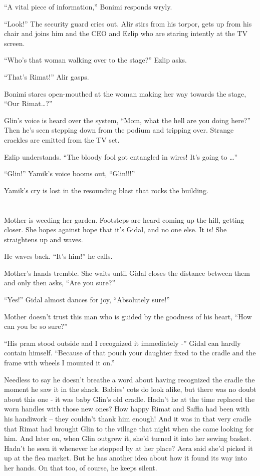 \documentclass[twoside,11pt]{book}
\begin{document}
``A vital piece of information,'' Bonimi responds wryly.

``Look!'' The security guard cries out. Alir stirs from his torpor, gets up from his chair and
joins him and the CEO and Ezlip who are staring intently at the TV screen.

``Who's that woman walking over to the stage?'' Ezlip asks.

``That's Rimat!'' Alir gasps.

Bonimi stares open-mouthed at the woman making her way towards the stage, ``Our
Rimat{\dots}?''

Glin's voice is heard over the system, ``Mom, what the hell are you doing here?'' Then
he's seen stepping down from the podium and tripping over. Strange crackles
are emitted from the TV set.

Ezlip understands. ``The bloody fool got entangled in wires! It's going to {\dots}''

``Glin!'' Yamik's voice booms{ }out,
``Glin!!!''

Yamik's cry is lost in the resounding blast that rocks the building.


\bigskip

\chapter{}

Mother is weeding her garden. Footsteps are heard coming up the hill, getting closer. She hopes against hope that it's
Gidal, and{ }no one else. It is! She straightens up and waves.

He waves back. ``It's him!'' he calls.

Mother's hands tremble. She waits until Gidal closes the distance between them and only then
asks,{ }``Are you sure?''

``Yes!'' Gidal almost dances for joy, ``Absolutely sure!''

Mother doesn't trust this man who is guided by the goodness of his heart, ``How can you be so sure?''

``His pram stood outside and I recognized it immediately -'' Gidal can hardly contain himself.
``Because of that pouch your daughter fixed to the cradle and the frame with wheels I mounted it
on.''

Needless to say he doesn't breathe a word about having recognized the cradle the moment he saw it in the shack. Babies'
cots do look alike, but there was no doubt about this one - it was baby Glin's old cradle. Hadn't he at the time
replaced the worn handles with those new ones? How happy Rimat and Saffia had been with his handiwork -- they couldn't
thank him enough!{ }And it was in that very cradle that Rimat had
brought{ }Glin to the village that night when she came looking for him. And
later on, when Glin outgrew it, she'd turned it into her sewing basket. Hadn't he seen it whenever he stopped
by{ }at{ }her place? Aera said she'd picked it up at the flea market. But he has another
idea about how it found its way into her hands. On that too, of course, he keeps silent.
\end{document}
